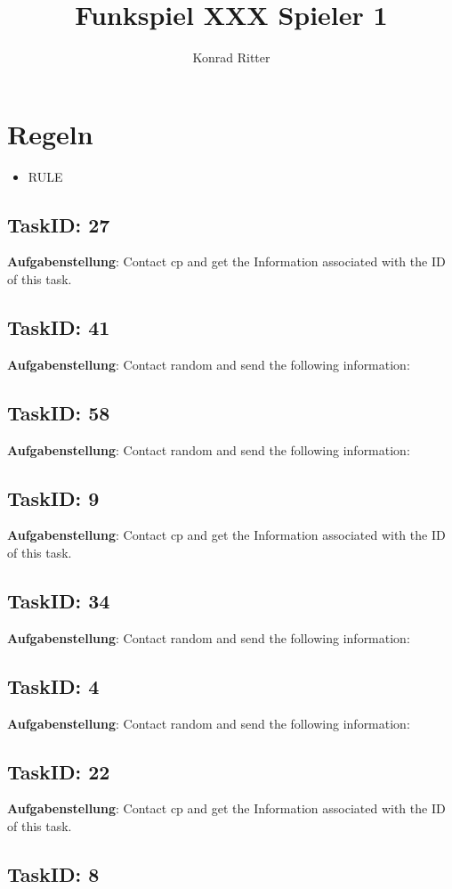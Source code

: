 \documentclass[12pt,a4paper]{scrreprt}
\author{Konrad Ritter}
\title{Funkspiel XXX Spieler 1}
\begin{document}
\maketitle
\section{Regeln}
\begin{itemize}
	\item RULE
\end{itemize}

\subsection{TaskID: 27}
\textbf{Aufgabenstellung}: Contact {cp} and get the Information associated with the ID of this task.\subsection{TaskID: 41}
\textbf{Aufgabenstellung}: Contact random and send the following information: \subsection{TaskID: 58}
\textbf{Aufgabenstellung}: Contact random and send the following information: \subsection{TaskID: 9}
\textbf{Aufgabenstellung}: Contact {cp} and get the Information associated with the ID of this task.\subsection{TaskID: 34}
\textbf{Aufgabenstellung}: Contact random and send the following information: \subsection{TaskID: 4}
\textbf{Aufgabenstellung}: Contact random and send the following information: \subsection{TaskID: 22}
\textbf{Aufgabenstellung}: Contact {cp} and get the Information associated with the ID of this task.\subsection{TaskID: 8}
\end{document}

